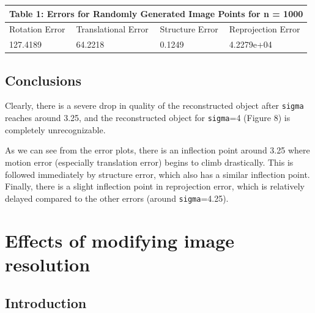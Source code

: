 \documentclass{article}
\begin{document}
\begin{tabular}{ |p{3cm}|p{3cm}|p{3cm}|p{3cm}|  }
 \hline
 \multicolumn{4}{|c|}{Table 1: Errors for Randomly Generated Image Points for n = 1000} \\
 \hline
 Rotation Error & Translational Error & Structure Error & Reprojection Error\\
 \hline
 127.4189 & 64.2218 & 0.1249 & 4.2279e+04\\
 \hline
\end{tabular}


\subsection{Conclusions}

Clearly, there is a severe drop in quality of the reconstructed object after \texttt{sigma} reaches around 3.25, and the reconstructed object for \texttt{sigma}=4 (Figure 8) is completely unrecognizable.

As we can see from the error plots, there is an inflection point around 3.25 where motion error (especially translation error) begins to climb drastically. This is followed immediately by structure error, which also has a similar inflection point. Finally, there is a slight inflection point in reprojection error, which is relatively delayed compared to the other errors (around \texttt{sigma}=4.25).











\section{Effects of modifying image resolution}

\subsection{Introduction}
\end{document}
